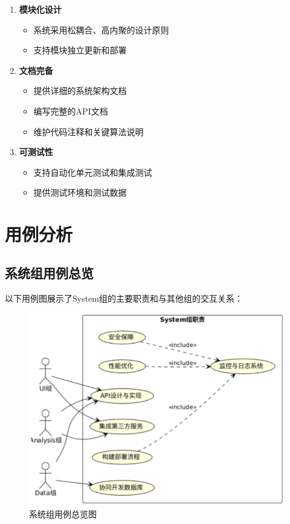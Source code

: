 \documentclass[a4paper,12pt]{article}
\begin{document}
\begin{enumerate}
  \item \textbf{模块化设计}
  \begin{itemize}
    \item 系统采用松耦合、高内聚的设计原则
    \item 支持模块独立更新和部署
  \end{itemize}
  
  \item \textbf{文档完备}
  \begin{itemize}
    \item 提供详细的系统架构文档
    \item 编写完整的API文档
    \item 维护代码注释和关键算法说明
  \end{itemize}
  
  \item \textbf{可测试性}
  \begin{itemize}
    \item 支持自动化单元测试和集成测试
    \item 提供测试环境和测试数据
  \end{itemize}
\end{enumerate}

\section{用例分析}

\subsection{系统组用例总览}

以下用例图展示了System组的主要职责和与其他组的交互关系：

\begin{figure}[H]
    \centering
    \includegraphics[width=0.75\linewidth]{assets/image2.png}
    \caption{系统组用例总览图}
    \label{fig:system-overview}
\end{figure}
\end{document}
